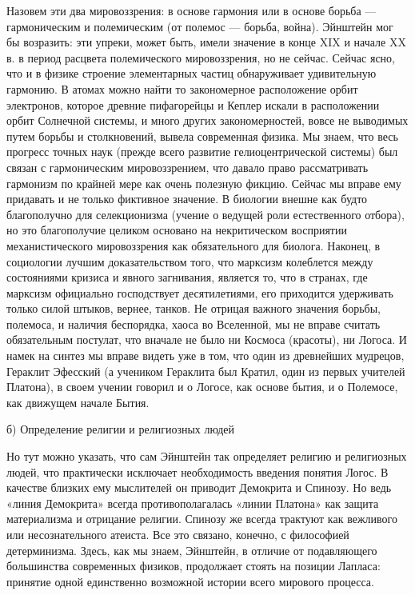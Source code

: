 Назовем  эти  два  мировоззрения:  в  основе  гармония  или  в  основе
борьба  ---  гармоническим  и  полемическим (от  полемос  ---  борьба,
война).  Эйнштейн мог  бы  возразить: эти  упреки,  может быть,  имели
значение в  конце XIX и начале  XX в. в период  расцвета полемического
мировоззрения,  но не  сейчас. Сейчас  ясно, что  и в  физике строение
элементарных  частиц  обнаруживает  удивительную  гармонию.  В  атомах
можно  найти то  закономерное расположение  орбит электронов,  которое
древние  пифагорейцы и  Кеплер искали  в расположении  орбит Солнечной
системы,  и много  других  закономерностей, вовсе  не выводимых  путем
борьбы  и  столкновений,  вывела  современная физика.  Мы  знаем,  что
весь  прогресс точных  наук (прежде  всего развитие  гелиоцентрической
системы) был  связан с гармоническим мировоззрением,  что давало право
рассматривать  гармонизм по  крайней мере  как очень  полезную фикцию.
Сейчас  мы вправе  ему придавать  и  не только  фиктивное значение.  В
биологии  внешне как  будто благополучно  для селекционизма  (учение о
ведущей  роли  естественного  отбора),  но  это  благополучие  целиком
основано  на некритическом  восприятии механистического  мировоззрения
как   обязательного  для   биолога.  Наконец,   в  социологии   лучшим
доказательством  того,  что   марксизм  колеблется  между  состояниями
кризиса и явного загнивания, является  то, что в странах, где марксизм
официально  господствует  десятилетиями,   его  приходится  удерживать
только  силой  штыков, вернее,  танков.  Не  отрицая важного  значения
борьбы,  полемоса, и  наличия беспорядка,  хаоса во  Вселенной, мы  не
вправе считать обязательным  постулат, что вначале не  было ни Космоса
(красоты), ни  Логоса. И намек на  синтез мы вправе видеть  уже в том,
что  один  из  древнейших  мудрецов,  Гераклит  Эфесский  (а  учеником
Гераклита был Кратил, один из первых учителей Платона), в своем учении
говорил  и о  Логосе, как  основе бытия,  и о  Полемосе, как  движущем
начале Бытия.

б) Определение религии и религиозных людей

Но  тут можно  указать,  что  сам Эйнштейн  так  определяет религию  и
религиозных  людей, что  практически исключает  необходимость введения
понятия Логос. В качестве близких ему мыслителей он приводит Демокрита
и Спинозу.  Но ведь «линия Демокрита»  всегда противополагалась «линии
Платона»  как  защита материализма  и  отрицание  религии. Спинозу  же
всегда  трактуют как  вежливого или  несознательного атеиста.  Все это
связано,  конечно, с  философией  детерминизма. Здесь,  как мы  знаем,
Эйнштейн, в  отличие от подавляющего большинства  современных физиков,
продолжает  стоять  на  позиции Лапласа:  принятие  одной  единственно
возможной истории всего мирового процесса.

